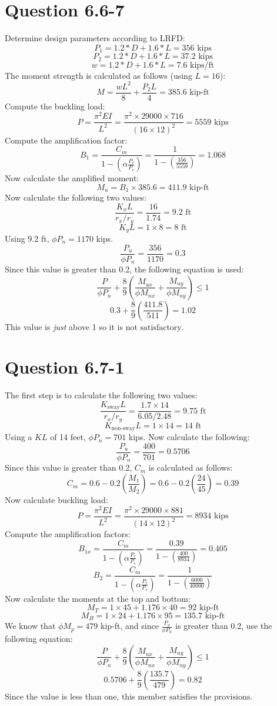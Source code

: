 \documentclass{article}
\begin{document}
\section*{Question 6.6-7}
Determine design parameters according to LRFD: 
\[P_1=1.2*D+1.6*L=356\text{ kips}\] 
\[P_2=1.2*D+1.6*L=37.2\text{ kips}\]
\[w=1.2*D+1.6*L=7.6\text{ kips/ft}\] 
The moment strength is calculated as follows (using $L=16$): 
\[M=\frac{wL^2}{8}+\frac{P_2L}{4}=385.6\text{ kip-ft}\]
Compute the buckling load: 
\[P=\frac{\pi^2EI}{L^2}=\frac{\pi^2\times 29000\times 716}{(16\times 12)^2}=5559\text{ kips}\]
Compute the amplification factor: 
\[B_1=\frac{C_m}{1-\left(\alpha\frac{P_r}{P_e}\right)}=\frac{1}{1-\left(\frac{356}{5559}\right)}=1.068\] 
Now calculate the amplified moment: 
\[M_u=B_1\times 385.6=411.9\text{ kip-ft}\]
Now calculate the following two values: 
\[\frac{K_xL}{r_x/r_y}=\frac{16}{1.74}=9.2\text{ ft}\]
\[K_yL=1\times 8=8\text{ ft}\]
Using 9.2 ft, $\phi P_n=1170$ kips. 
\[\frac{P_u}{\phi P_n}=\frac{356}{1170}=0.3\] 
Since this value is greater than 0.2, the following equation is used: 
\[\frac{P}{\phi P_n}+\frac{8}{9}\left(\frac{M_{ux}}{\phi M_{nx}}+\frac{M_{uy}}{\phi M_{ny}}\right) \leq 1\]
\[0.3+\frac{8}{9}\left(\frac{411.8}{511}\right)=1.02\]
This value is \emph{just} above 1 so it is $\boxed{\text{not satisfactory}}$.
\section*{Question 6.7-1}
The first step is to calculate the following two values: 
\[\frac{K_\text{sway}L}{r_x/r_y}=\frac{1.7\times 14}{6.05/2.48}=9.75\text{ ft}\]
\[K_\text{non-sway}L=1\times 14=14\text{ ft}\]
Using a $KL$ of 14 feet, $\phi P_n=701$ kips. Now calculate the following: 
\[\frac{P_u}{\phi P_n}=\frac{400}{701}=0.5706\] 
Since this value is greater than 0.2, $C_m$ is calculated as follows: 
\[C_m=0.6-0.2\left(\frac{M_1}{M_2}\right)=0.6-0.2\left(\frac{24}{45}\right)=0.39\]
Now calculate buckling load: 
\[P=\frac{\pi^2EI}{L^2}=\frac{\pi^2\times 29000\times 881}{(14\times 12)^2}=8934\text{ kips}\]
Compute the amplification factors: 
\[B_{1x}=\frac{C_m}{1-\left(\alpha\frac{P_r}{P_e}\right)}=\frac{0.39}{1-\left(\frac{400}{8934}\right)}=0.405\] 
\[B_2=\frac{C_m}{1-\left(\alpha\frac{P_r}{P_e}\right)}=\frac{1}{1-\left(\frac{6000}{40000}\right)}\]
Now calculate the moments at the top and bottom: 
\[M_T=1\times 45 + 1.176\times 40 = 92 \text{ kip-ft}\] 
\[M_B=1\times 24+1.176\times 95 = 135.7\text{ kip-ft}\] 
We know that $\phi M_p=479$ kip-ft, and since $\frac{P_u}{\phi P_n}$ is greater than 0.2, use the following equation: 
\[\frac{P}{\phi P_n}+\frac{8}{9}\left(\frac{M_{ux}}{\phi M_{nx}}+\frac{M_{uy}}{\phi M_{ny}}\right) \leq 1\]
\[0.5706+\frac{8}{9}\left(\frac{135.7}{479}\right)=0.82\]
Since the value is less than one, this member $\boxed{\text{satisfies the provisions}}$.
\end{document}
